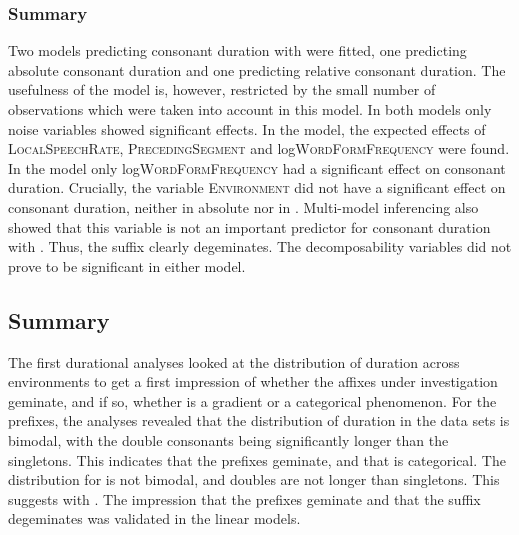 \subsubsection{Summary}
Two models predicting consonant duration with  were fitted, one predicting absolute consonant duration and one predicting relative consonant duration. The usefulness of the  model is, however,  restricted by the small number of observations which were taken into account in this model. In both models only noise variables showed significant effects. 
In the  model, the expected effects of \textsc{LocalSpeechRate}, \textsc{PrecedingSegment} and log\textsc{WordFormFrequency} were found. In the  model only log\textsc{WordFormFrequency} had a significant effect on consonant duration.
Crucially, the variable \textsc{Environment} did not have a significant effect on consonant duration, neither in absolute nor in . Multi-model inferencing also showed that this variable is not an important predictor for consonant duration with . Thus, the suffix  clearly degeminates.
The decomposability variables did not prove to be significant in either model.




\subsection{Summary} \label{Summary Corpus Study}

The first durational analyses looked at the distribution of duration across environments to get a first impression of whether the affixes under investigation geminate, and if so, whether  is a gradient or a categorical phenomenon. 
For the prefixes, the analyses revealed that the distribution of duration in the data sets is bimodal, with the double consonants being significantly longer than the singletons. This indicates that the prefixes geminate, and that  is categorical. The distribution for  is not bimodal, and doubles are not longer than singletons. This suggests  with . The impression that the prefixes geminate and that the suffix degeminates was validated in the linear models.


